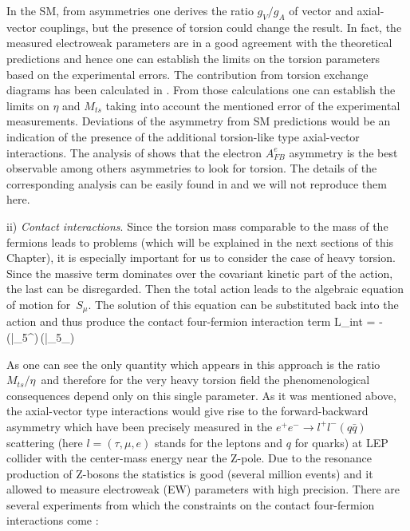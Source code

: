 In the SM, from asymmetries one derives the ratio $g_V/g_A$ of 
vector and axial-vector couplings, but the presence of torsion could 
change the result. In fact, the measured electroweak parameters 
are in a good agreement with the
theoretical predictions and hence one can establish the limits on the
torsion parameters based on the experimental errors. The contribution 
from torsion exchange diagrams has been calculated 
in \cite{betor}. From those calculations one can establish the limits 
on $\eta$ and $M_{ts}$ taking into account the mentioned error of 
the experimental measurements. Deviations of the asymmetry from SM
predictions would be an indication of the presence of the additional 
torsion-like type axial-vector  interactions. The analysis of
\cite{betor} shows that the electron $A^e_{FB}$ asymmetry is the best 
observable among others asymmetries to look for torsion.
The details of the corresponding analysis can be easily found in 
\cite{betor} and we will not reproduce them here. 
\vskip 3mm

ii) {\large\it Contact interactions}.
Since the torsion mass comparable to the mass of the fermions
leads to problems (which will be explained in the next sections
of this Chapter), it is especially important for us to consider 
the case of heavy torsion. Since
the massive term dominates over the covariant kinetic
part of the action, the last can be disregarded. Then the total 
action leads to the algebraic equation of motion for $\,S_\mu$. 
The solution of this equation can be substituted back into
the action and thus produce the contact four-fermion
interaction term
\beq
{\cal L}_{int} = - \,
({\bar \psi}\ga_5\ga^\mu\psi)\,({\bar \psi}\ga_5\ga_\mu\psi)
\label{contact}
\eeq

As one can see the only quantity which appears in this 
approach is the ratio ${M_{ts}}/{\eta}\,$ and therefore for the 
very heavy torsion field the phenomenological consequences 
depend only on this single parameter. As it was mentioned above, the
axial-vector type interactions would give rise to the forward-backward
asymmetry which have been precisely measured in the
$e^+e^- \rightarrow l^+l^- (q\bar{q})$  scattering
(here $l=(\tau,\mu,e)$ stands for the leptons and $q$ for quarks)
at LEP collider with the center-mass energy near the Z-pole.
Due to the resonance production of Z-bosons the statistics is good
(several million events) and it allowed to measure electroweak (EW)
parameters with high precision. There are several experiments
from which the constraints on the contact four-fermion interactions
come \cite{betor}:
\vskip 1mm

